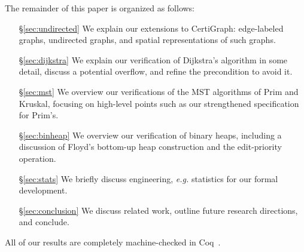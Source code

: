 The remainder of this paper is organized as follows:
\begin{itemize}
    \item[\S\ref{sec:undirected}] We explain our extensions to CertiGraph: edge-labeled graphs, undirected graphs, and spatial representations of such graphs.
    \item[\S\ref{sec:dijkstra}] We explain our verification of Dijkstra's algorithm in some detail, discuss a potential overflow, and refine the precondition to avoid it. %
    \item[\S\ref{sec:mst}] We overview our verifications of the MST algorithms of Prim and Kruskal, focusing on high-level points such as our strengthened specification for Prim's.
    \item[\S\ref{sec:binheap}] We overview our verification of binary heaps, including a discussion of Floyd's bottom-up heap construction and the edit-priority operation.
    \item[\S\ref{sec:stats}] We briefly discuss engineering, \emph{e.g.} statistics for our formal development.
    \item[\S\ref{sec:conclusion}] We discuss related work, outline future research directions, and conclude.
\end{itemize}

\noindent All of our results are completely machine-checked in Coq~\cite{CITE}.%
